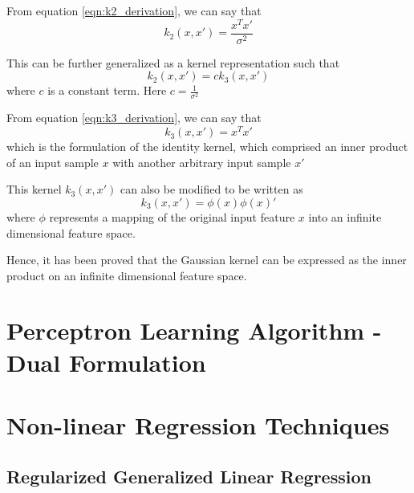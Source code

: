 \documentclass[parskip=full]{scrartcl}
\begin{document}
        From equation \ref{eqn:k2_derivation}, we can say that
        $$k_2(x, x\prime) = \frac{x^Tx\prime}{\sigma^2}$$

        This can be further generalized as a kernel representation such that
        \begin{equation} \label{eqn:k3_derivation}
            k_2(x, x\prime) = c k_3(x, x\prime)
        \end{equation}
        where $c$ is a constant term. Here $c = \frac{1}{\sigma^2}$

        From equation \ref{eqn:k3_derivation}, we can say that
        $$k_3(x, x\prime) = x^Tx\prime$$
        which is the formulation of the identity kernel, which comprised an inner product of an input sample $x$ with another arbitrary input sample $x\prime$

        This kernel $k_3(x, x\prime)$ can also be modified to be written as 
        \begin{equation}
            k_3(x, x\prime) = \phi(x)\phi(x)\prime
        \end{equation}
        where $\phi$ represents a mapping of the original input feature $x$ into an infinite dimensional feature space.

        Hence, it has been proved that the Gaussian kernel can be expressed as the inner product on an infinite dimensional feature space.
    



\section{Perceptron Learning Algorithm - Dual Formulation} %
\label{sec:perceptron_learning_algorithm_dual_formulation}




\section{Non-linear Regression Techniques} %
\label{sec:non_linear_regression_techniques}

    \subsection{Regularized Generalized Linear Regression} %
    \label{sub:regularized_generalized_linear_regression}
    
\end{document}
